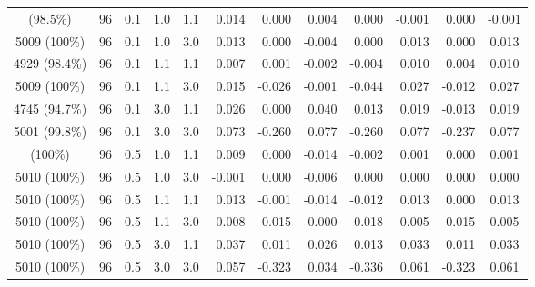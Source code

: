 \begin{longtable}[t]{cccccrrrrrrc}
\addlinespace
4934 (98.5\%) & 96 & 0.1 & 1.0 & 1.1 & 0.014 & 0.000 & 0.004 & 0.000 & -0.001 & 0.000 & -0.001\\
5009 (100\%) & 96 & 0.1 & 1.0 & 3.0 & 0.013 & 0.000 & -0.004 & 0.000 & 0.013 & 0.000 & 0.013\\
4929 (98.4\%) & 96 & 0.1 & 1.1 & 1.1 & 0.007 & 0.001 & -0.002 & -0.004 & 0.010 & 0.004 & 0.010\\
5009 (100\%) & 96 & 0.1 & 1.1 & 3.0 & 0.015 & -0.026 & -0.001 & -0.044 & 0.027 & -0.012 & 0.027\\
4745 (94.7\%) & 96 & 0.1 & 3.0 & 1.1 & 0.026 & 0.000 & 0.040 & 0.013 & 0.019 & -0.013 & 0.019\\
5001 (99.8\%) & 96 & 0.1 & 3.0 & 3.0 & 0.073 & -0.260 & 0.077 & -0.260 & 0.077 & -0.237 & 0.077\\
\addlinespace
5010 (100\%) & 96 & 0.5 & 1.0 & 1.1 & 0.009 & 0.000 & -0.014 & -0.002 & 0.001 & 0.000 & 0.001\\
5010 (100\%) & 96 & 0.5 & 1.0 & 3.0 & -0.001 & 0.000 & -0.006 & 0.000 & 0.000 & 0.000 & 0.000\\
5010 (100\%) & 96 & 0.5 & 1.1 & 1.1 & 0.013 & -0.001 & -0.014 & -0.012 & 0.013 & 0.000 & 0.013\\
5010 (100\%) & 96 & 0.5 & 1.1 & 3.0 & 0.008 & -0.015 & 0.000 & -0.018 & 0.005 & -0.015 & 0.005\\
5010 (100\%) & 96 & 0.5 & 3.0 & 1.1 & 0.037 & 0.011 & 0.026 & 0.013 & 0.033 & 0.011 & 0.033\\
5010 (100\%) & 96 & 0.5 & 3.0 & 3.0 & 0.057 & -0.323 & 0.034 & -0.336 & 0.061 & -0.323 & 0.061\\
\bottomrule
\end{longtable}
\endgroup{}
